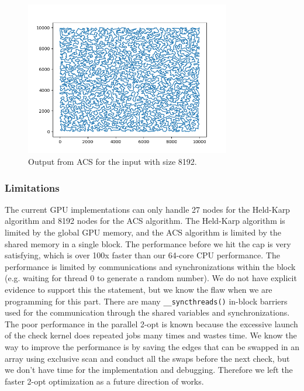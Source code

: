 \documentclass{article}
\begin{document}
\begin{figure}
    \centering
    \includegraphics[width=0.8\textwidth]{8192.png}
    \caption{Output from ACS for the input with size 8192.}
    \label{fig:8192}
\end{figure}

\subsubsection{Limitations}
    The current GPU implementations can only handle 27 nodes for the Held-Karp algorithm and 8192 nodes for the ACS algorithm. The Held-Karp algorithm is limited by the global GPU memory, and the ACS algorithm is limited by the shared memory in a single block. The performance before we hit the cap is very satisfying, which is over 100x faster than our 64-core CPU performance. The performance is limited by communications and synchronizations within the block (e.g. waiting for thread 0 to generate a random number). We do not have explicit evidence to support this the statement, but we know the flaw when we are programming for this part. There are many \texttt{\_\_syncthreads()} in-block barriers used for the communication through the shared variables and synchronizations. The poor performance in the parallel 2-opt is known because the excessive launch of the check kernel does repeated jobs many times and wastes time. We know the way to improve the performance is by saving the edges that can be swapped in an array using exclusive scan and conduct all the swaps before the next check, but we don't have time for the implementation and debugging. Therefore we left the faster 2-opt optimization as a future direction of works.
\end{document}
